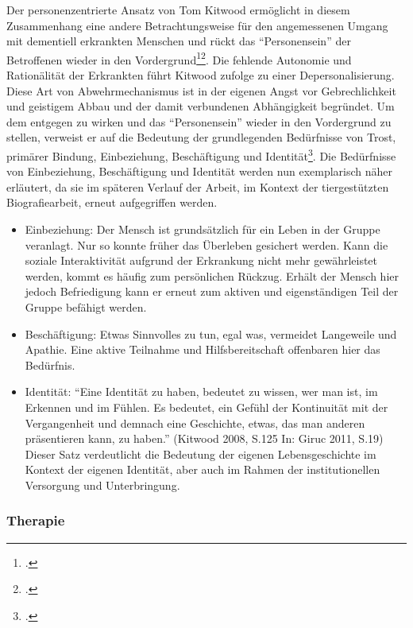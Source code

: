 Der personenzentrierte Ansatz von Tom Kitwood ermöglicht in diesem Zusammenhang eine andere Betrachtungsweise für den angemessenen Umgang mit dementiell erkrankten Menschen und rückt das "`Personensein"' der Betroffenen wieder in den Vordergrund\footcite[17f]{Giruc2011}\footcite[67f]{o.A.2013}. Die fehlende Autonomie und Rationälität der Erkrankten führt Kitwood zufolge zu einer Depersonalisierung. Diese Art von  Abwehrmechanismus ist in der eigenen Angst vor Gebrechlichkeit und geistigem Abbau und der damit verbundenen Abhängigkeit begründet. Um dem entgegen zu wirken und das "`Personensein"' wieder in den Vordergrund zu stellen, verweist er auf die Bedeutung der grundlegenden Bedürfnisse von Trost, primärer Bindung, Einbeziehung, Beschäftigung und Identität\footcite[18f]{Giruc2011}. Die Bedürfnisse von Einbeziehung, Beschäftigung und Identität werden nun exemplarisch näher erläutert, da sie im späteren Verlauf der Arbeit, im Kontext der tiergestützten Biografiearbeit, erneut aufgegriffen werden.

\begin{itemize}
\item Einbeziehung: Der Mensch ist grundsätzlich für ein Leben in der Gruppe veranlagt. Nur so konnte früher das Überleben gesichert werden. Kann die soziale Interaktivität aufgrund der Erkrankung nicht mehr gewährleistet werden, kommt es häufig zum persönlichen Rückzug. Erhält der Mensch hier jedoch Befriedigung kann er erneut zum aktiven und eigenständigen Teil der Gruppe befähigt werden.
\item Beschäftigung: Etwas Sinnvolles zu tun, egal was, vermeidet Langeweile und Apathie. Eine aktive Teilnahme und Hilfsbereitschaft offenbaren hier das Bedürfnis.
\item Identität: "`Eine Identität zu haben, bedeutet zu wissen, wer man ist, im Erkennen und im Fühlen. Es bedeutet, ein Gefühl der Kontinuität mit der Vergangenheit und demnach eine Geschichte, etwas, das man anderen präsentieren kann, zu haben."' (Kitwood 2008, S.125 In: Giruc 2011, S.19) Dieser Satz verdeutlicht die Bedeutung der eigenen Lebensgeschichte im Kontext der eigenen Identität, aber auch im Rahmen der institutionellen Versorgung und Unterbringung.
\end{itemize}

\subsubsection{Therapie}
\label{sec:k2.2.4_Therapie}

